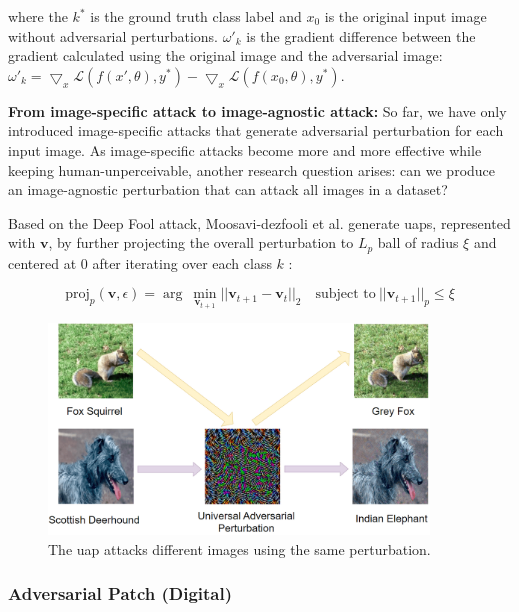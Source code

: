 where the $k^*$ is the ground truth class label and $x_0$ is the original input image without adversarial perturbations. $\omega'_k$ is the gradient difference between the gradient calculated using the original image and the adversarial image:  $\omega'_k = \bigtriangledown_x \mathcal{L}(f(x', \theta), y^*) - \bigtriangledown_x \mathcal{L}(f(x_0, \theta), y^*)$.

\textbf{From image-specific attack to image-agnostic attack:} So far, we have only introduced image-specific attacks that generate adversarial perturbation for each input image. As image-specific attacks become more and more effective while keeping human-unperceivable, another research question arises: can we produce an image-agnostic perturbation that can attack all images in a dataset?

Based on the Deep Fool attack, Moosavi-dezfooli et al. generate \acrshort{uap}s, represented with $\textbf{v}$, by further projecting the overall perturbation to $L_p$ ball of radius $\xi$ and centered at 0 after iterating over each class $k$ \citep{moosavidezfooli2017universal}:

\begin{equation}
\text{proj}_p(\textbf{v}, \epsilon)= \arg\ \underset{\textbf{v}_{t+1}}{\min}||\textbf{v}_{t+1} - \textbf{v}_{t}||_2 \quad \text{subject to}\ ||\textbf{v}_{t+1}||_p\leq\xi
\end{equation}

\begin{figure}[H]
\centering
\includegraphics[width=0.9\textwidth]{figures/chapter_intro/uap.png}
\caption{The \acrfull{uap} attacks different images using the same perturbation.}
\label{fig.uap}
\end{figure}


\subsubsection{Adversarial Patch (Digital)}

